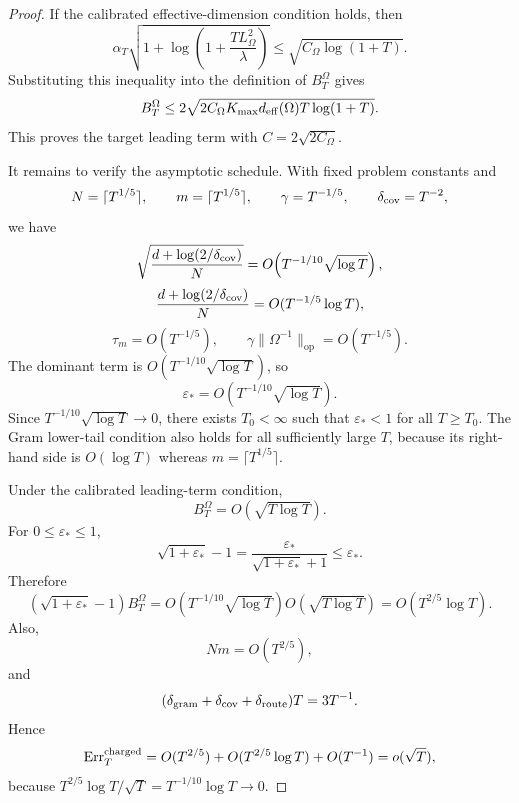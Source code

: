 \documentclass{article} %
\begin{document}
\begin{proof}
If the calibrated effective-dimension condition holds, then
\[
\alpha_T
\sqrt{
1+\log\!\left(1+\frac{TL_\Omega^2}{\lambda}\right)
}
\le
\sqrt{C_\Omega\log(1+T)}.
\]
Substituting this inequality into the definition of \(B_T^\Omega\) gives
\[
B_T^\Omega
\le
2\sqrt{
2C_\Omega K_{\max}d_{\rm eff}(\Omega)T\log(1+T)
}.
\]
This proves the target leading term with \(C=2\sqrt{2C_\Omega}\).

It remains to verify the asymptotic schedule.  With fixed problem constants and
\[
N=\lceil T^{1/5}\rceil,\qquad
m=\lceil T^{1/5}\rceil,\qquad
\gamma=T^{-1/5},\qquad
\delta_{\rm cov}=T^{-2},
\]
we have
\[
\sqrt{\frac{d+\log(2/\delta_{\rm cov})}{N}}
=
O\!\left(T^{-1/10}\sqrt{\log T}\right),
\]
\[
\frac{d+\log(2/\delta_{\rm cov})}{N}
=
O(T^{-1/5}\log T),
\]
\[
\tau_m=O(T^{-1/5}),
\qquad
\gamma\|\Omega^{-1}\|_{\mathrm{op}}=O(T^{-1/5}).
\]
The dominant term is \(O(T^{-1/10}\sqrt{\log T})\), so
\[
\varepsilon_*
=
O\!\left(T^{-1/10}\sqrt{\log T}\right).
\]
Since \(T^{-1/10}\sqrt{\log T}\to0\), there exists \(T_0<\infty\) such that
\(\varepsilon_*<1\) for all \(T\ge T_0\).  The Gram lower-tail condition also
holds for all sufficiently large \(T\), because its right-hand side is
\(O(\log T)\) whereas \(m=\lceil T^{1/5}\rceil\).

Under the calibrated leading-term condition,
\[
B_T^\Omega=O(\sqrt{T\log T}).
\]
For \(0\le\varepsilon_*\le1\),
\[
\sqrt{1+\varepsilon_*}-1
=
\frac{\varepsilon_*}{\sqrt{1+\varepsilon_*}+1}
\le
\varepsilon_*.
\]
Therefore
\[
(\sqrt{1+\varepsilon_*}-1)B_T^\Omega
=
O\!\left(T^{-1/10}\sqrt{\log T}\right)
O(\sqrt{T\log T})
=
O(T^{2/5}\log T).
\]
Also,
\[
Nm=O(T^{2/5}),
\]
and
\[
(\delta_{\rm gram}+\delta_{\rm cov}+\delta_{\rm route})T
=
3T^{-1}.
\]
Hence
\[
\operatorname{Err}_T^{\rm charged}
=
O(T^{2/5})+O(T^{2/5}\log T)+O(T^{-1})
=
o(\sqrt T),
\]
because \(T^{2/5}\log T/\sqrt T=T^{-1/10}\log T\to0\).
\end{proof}



\end{document}
